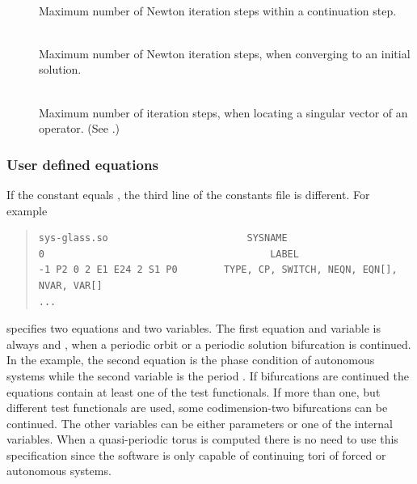 \documentclass[10pt,a4paper]{ddedoc}
\begin{document}
\begin{description}
%
\item[] ~\\
Maximum number of Newton iteration steps within a continuation step.
%
\item[] ~\\
Maximum number of Newton iteration steps, when converging to an initial
solution.
%
\item[] ~\\
Maximum number of iteration steps, when locating a singular vector of an operator. (See .)
%
\end{description}

\subsubsection{User defined equations}
If the  constant equals , the third line of the constants
file is different. For example
{ \small \begin{quote} \begin{lstlisting}[basicstyle=\tt,frame=single]
sys-glass.so						SYSNAME
0										LABEL
-1 P2 0 2 E1 E24 2 S1 P0		TYPE, CP, SWITCH, NEQN, EQN[], NVAR, VAR[]
...
\end{lstlisting} \end{quote} } \noindent
specifies two equations and two variables. The first equation and variable is
always  and , when a periodic orbit or a periodic solution
bifurcation is continued. In the example, the second equation  is the
phase condition of autonomous systems while the second variable is the period
. If bifurcations are continued the equations contain at least one of
the test functionals. If more than one, but different test functionals are used,
some codimension-two bifurcations can be continued. The other variables can be
either parameters or one of the internal variables. When a quasi-periodic torus
is computed there is no need to use this specification since the
software is only capable of continuing tori of forced or autonomous systems.
\end{document}
